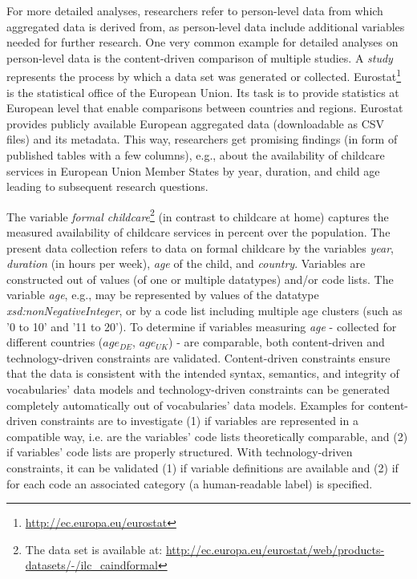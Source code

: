 \documentclass{llncs}
\begin{document}
For more detailed analyses, researchers refer to person-level data from which aggregated data is derived from, 
as person-level data include additional variables needed for further research.
One very common example for detailed analyses on person-level data is the content-driven comparison of multiple studies.
A \emph{study} represents the process by which a data set was generated or collected.
Eurostat\footnote{\url{http://ec.europa.eu/eurostat}} is the statistical office of the European Union. Its task is to provide statistics at European level that enable comparisons between countries and regions.
Eurostat provides publicly available European aggregated data (downloadable as CSV files) and its metadata.
This way, researchers get promising findings (in form of published tables with a few columns), e.g., about the availability of childcare services in European Union Member States by year, duration, and child age  leading to subsequent research questions.

The variable \emph{formal childcare}\footnote{The data set is available at: \url{http://ec.europa.eu/eurostat/web/products-datasets/-/ilc_caindformal}} (in contrast to childcare at home)
captures the measured availability of childcare services in percent over the population.
The present data collection refers to data on formal childcare by the variables \emph{year}, \emph{duration} (in hours per week), \emph{age} of the child, and \emph{country}.
Variables are constructed out of values (of one or multiple datatypes) and/or code lists.
The variable \emph{age}, e.g., may be represented by values of the datatype \emph{xsd:nonNegativeInteger}, or by a code list including multiple age clusters (such as '0 to 10' and '11 to 20'). 
To determine if variables measuring \emph{age} 
- collected for different countries (\emph{$age_{DE}$}, \emph{$age_{UK}$}) - 
are comparable, both content-driven and technology-driven constraints are validated.
Content-driven constraints ensure that the data is consistent with the intended syntax, semantics, and integrity of vocabularies' data models and 
technology-driven constraints can be generated completely automatically out of vocabularies' data models. 
Examples for content-driven constraints are to investigate (1) if variables are represented in a compatible way,
i.e. are the variables' code lists theoretically comparable, and (2) if variables' code lists are properly structured.
With technology-driven constraints, it can be validated (1) if variable definitions are available and (2) if for each code an associated category (a human-readable label) is specified.
\end{document}
